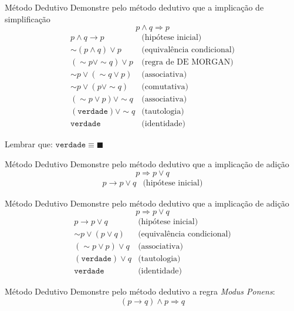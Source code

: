 \begin{frame}[t]{Método Dedutivo}
	Demonstre pelo método dedutivo que a implicação de simplificação $$p \wedge q \Rightarrow p$$
	\vskip 0.2cm
	$$\begin{array}{cl}
	p \wedge q \rightarrow p & \mbox{(hipótese inicial)} \\
	\sim(p \wedge q) \vee p & \mbox{(equivalência condicional)} \\
	(\sim p \vee\sim q) \vee p & \mbox{(regra de DE MORGAN)} \\
	\sim p \vee (\sim q \vee p) & \mbox{(associativa)} \\
	\sim p \vee (p \vee\sim q) & \mbox{(comutativa)} \\
	(\sim p \vee p) \vee\sim q & \mbox{(associativa)} \\
	(\mathtt{verdade}) \vee\sim q & \mbox{(tautologia)} \\
	\mathtt{verdade} & \mbox{(identidade)}
	\end{array}$$
	
	Lembrar que: $\mathtt{verdade} \equiv  \blacksquare $
	
\end{frame}

\begin{frame}[t]{Método Dedutivo}
	Demonstre pelo método dedutivo que a implicação de adição $$p \Rightarrow p \vee q$$
	\vskip 0.2cm
	$$\begin{array}{cl}
	p \rightarrow p \vee q & \mbox{(hipótese inicial)}
	\end{array}$$
\end{frame}

\begin{frame}[t]{Método Dedutivo}
	Demonstre pelo método dedutivo que a implicação de adição $$p \Rightarrow p \vee q$$
	\vskip 0.2cm
	$$\begin{array}{cl}
	p \rightarrow p \vee q & \mbox{(hipótese inicial)} \\
	\sim p \vee (p \vee q) & \mbox{(equivalência condicional)} \\
	(\sim p \vee p) \vee q & \mbox{(associativa)} \\
	(\mathtt{verdade}) \vee q & \mbox{(tautologia)} \\
	\mathtt{verdade} & \mbox{(identidade)}
	\end{array}$$
\end{frame}

\begin{frame}[t]{Método Dedutivo}
	Demonstre pelo método dedutivo a regra {\em Modus Ponens}: $$(p \rightarrow q) \wedge p \Rightarrow q$$
\end{frame}

